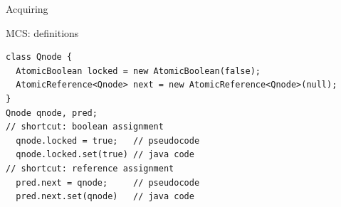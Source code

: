 \begin{frame}[noframenumbering]{Acquiring}
\end{frame}

\begin{frame}[t,fragile]{MCS: definitions}
\begin{verbatim}
class Qnode { 
  AtomicBoolean locked = new AtomicBoolean(false); 
  AtomicReference<Qnode> next = new AtomicReference<Qnode>(null); 
}
Qnode qnode, pred;
// shortcut: boolean assignment
  qnode.locked = true;   // pseudocode
  qnode.locked.set(true) // java code
// shortcut: reference assignment
  pred.next = qnode;     // pseudocode
  pred.next.set(qnode)   // java code
\end{verbatim}
\end{frame}

